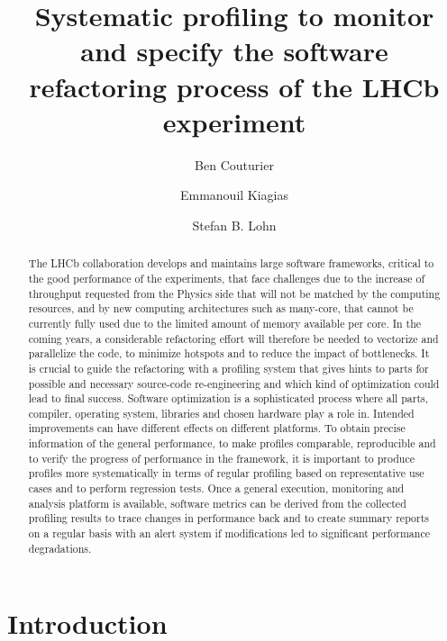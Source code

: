 \documentclass[a4paper]{jpconf}
\begin{document}
\title{Systematic profiling to monitor and specify the software refactoring process of the LHCb experiment}

\author{Ben Couturier}
\address{CERN, CH-1211 Geneva 23, Switzerland}

\author{Emmanouil Kiagias}
\address{CERN, CH-1211 Geneva 23, Switzerland}

\author{Stefan B. Lohn}
\address{CERN, CH-1211 Geneva 23, Switzerland}

\begin{abstract}
The LHCb collaboration develops and maintains large software frameworks, critical to the good performance of the experiments, that face challenges due to the increase of throughput requested from the Physics side that will not be matched by the computing resources, and by new computing architectures such as many-core, that cannot be currently fully used due to the limited amount of memory available per core. In the coming years, a considerable refactoring effort will therefore be needed to vectorize and parallelize the code, to minimize hotspots and to reduce the impact of bottlenecks. It is crucial to guide the refactoring with a profiling system that gives hints to parts for possible and necessary source-code re-engineering and which kind of optimization could lead to final success.
\newline
Software optimization is a sophisticated process where all parts, compiler, operating system, libraries and chosen hardware play a role in. Intended improvements can have different effects on different platforms. To obtain precise information of the general performance, to make profiles comparable, reproducible and to verify the progress of performance in the framework, it is important to produce profiles more systematically in terms of regular profiling based on representative use cases and to perform regression tests. Once a general execution, monitoring and analysis platform is available, software metrics can be derived from the collected profiling results to trace changes in performance back and to create summary reports on a regular basis with an alert system if modifications led to significant performance degradations.
\end{abstract}

\section{Introduction}
\label{sec:introduction}
\end{document}

